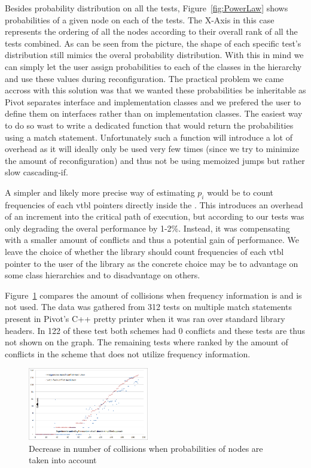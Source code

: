 Besides probability distribution on all the tests, Figure~\ref{fig:PowerLaw} 
shows probabilities of a given node on each of the tests. The X-Axis in this 
case represents the ordering of all the nodes according to their overall rank 
of all the tests combined. As can be seen from the picture, the shape of each 
specific test's distribution still mimics the overal probability distribution. 
With this in mind we can simply let the user assign probabilities to each of the 
classes in the hierarchy and use these values during reconfiguration. The 
practical problem we came accross with this solution was that we wanted these 
probabilities be inheritable as Pivot separates interface and implementation 
classes and we prefered the user to define them on interfaces rather than on 
implementation classes. The easiest way to do so wast to write a dedicated 
function that would return the probabilities using a match statement. 
Unfortunately such a function will introduce a lot of overhead as it will 
ideally only be used very few times (since we try to minimize the amount of 
reconfiguration) and thus not be using memoized jumps but rather slow 
cascading-if.

A simpler and likely more precise way of estimating $p_i$ would be to count 
frequencies of each vtbl pointers directly inside the . This 
introduces an overhead of an increment into the critical path of execution, but 
according to our tests was only degrading the overal performance by 1-2\%.
Instead, it was compensating with a smaller amount of conflicts and thus a 
potential gain of performance. We leave the choice of whether the library should 
count frequencies of each vtbl pointer to the user of the library as the 
concrete choice may be to advantage on some class hierarchies and to 
disadvantage on others.

Figure~\ref{fig:Collisions} compares the amount of collisions when frequency 
information is and is not used. The data was gathered from 312 tests on multiple 
match statements present in Pivot's C++ pretty printer when it was ran over 
standard library headers. In 122 of these test both schemes had 0 conflicts and 
these tests are thus not shown on the graph. The remaining tests where ranked by 
the amount of conflicts in the scheme that does not utilize frequency information.

\begin{figure}[htbp]
  \centering
    \includegraphics[width=0.47\textwidth]{CollisionsWithAndWithoutFrequencies.png}
  \caption{Decrease in number of collisions when probabilities of nodes are taken into account}
  \label{fig:Collisions}
\end{figure}


